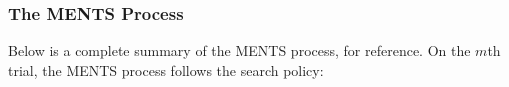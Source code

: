         

        

        
        
        
        \subsubsection{The MENTS Process}
        
        Below is a complete summary of the MENTS process, for reference. On the $m$th trial, the MENTS process follows the search policy:


